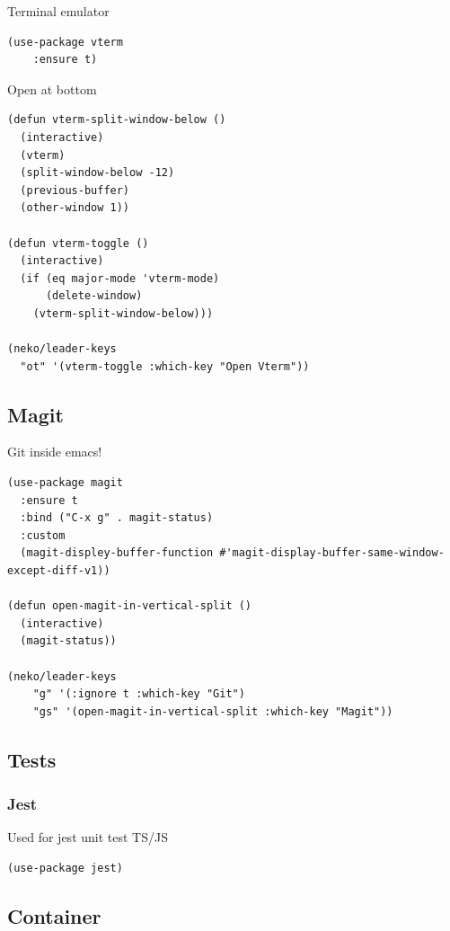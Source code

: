 \documentclass[11pt]{article}
\begin{document}
Terminal emulator

\begin{verbatim}
(use-package vterm
    :ensure t)
\end{verbatim}

Open at bottom

\begin{verbatim}
(defun vterm-split-window-below ()
  (interactive)
  (vterm)
  (split-window-below -12)
  (previous-buffer)
  (other-window 1))

(defun vterm-toggle ()
  (interactive)
  (if (eq major-mode 'vterm-mode)
      (delete-window)
    (vterm-split-window-below)))

(neko/leader-keys
  "ot" '(vterm-toggle :which-key "Open Vterm"))
\end{verbatim}

\subsection{Magit}
\label{sec:org11917c2}

Git inside emacs!

\begin{verbatim}
(use-package magit
  :ensure t
  :bind ("C-x g" . magit-status)
  :custom
  (magit-displey-buffer-function #'magit-display-buffer-same-window-except-diff-v1))

(defun open-magit-in-vertical-split ()
  (interactive)
  (magit-status))

(neko/leader-keys
    "g" '(:ignore t :which-key "Git")
    "gs" '(open-magit-in-vertical-split :which-key "Magit"))
\end{verbatim}

\subsection{Tests}
\label{sec:org28c4825}
\subsubsection{Jest}
\label{sec:org73dbc93}

Used for jest unit test TS/JS

\begin{verbatim}
(use-package jest)
\end{verbatim}

\subsection{Container}
\label{sec:orgaba1bf8}
\end{document}

